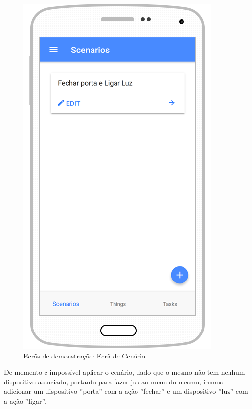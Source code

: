 \begin{figure}[H]
  \centering
        \includegraphics[scale=0.75]{img/demo/list_scenario.png}
  \caption{Ecrãs de demonstração: Ecrã de Cenário}
\end{figure}

De momento é impossível aplicar o cenário, dado que o mesmo não tem nenhum dispositivo associado, portanto para fazer jus ao nome do mesmo, iremos adicionar um dispositivo ''porta'' com a ação ''fechar'' e um dispositivo ''luz'' com a ação ''ligar''.

